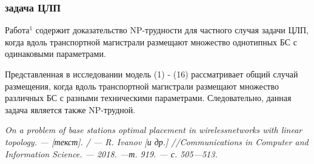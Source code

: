 \begin{frame}
    \frametitle{задача ЦЛП}
    \justifying
    
    Работа$^1$ содержит доказательство NP-трудности для частного случая задачи ЦЛП, когда вдоль транспортной магистрали размещают множество однотипных БС с одинаковыми параметрами. 
    \bigskip
    
    Представленная в исследовании модель (1) - (16) рассматривает общий случай размещения, когда вдоль транспортной магистрали размещают множество различных БС с разными техническими параметрами. Следовательно, данная задача является также NP-трудной.
    \bigskip

    
    \bigskip

    \bigskip
    \bigskip
    \begin{minipage}[b]{0.99\linewidth}
        \fontsize{6pt}{7.2}\selectfont
    \textit{ On a problem of base stations optimal placement in wirelessnetworks with linear topology. — [текст]. / — R. Ivanov [и др.] //Communications in Computer and Information Science. — 2018. —т. 919. — с. 505—513.}
    \end{minipage}

\end{frame}

